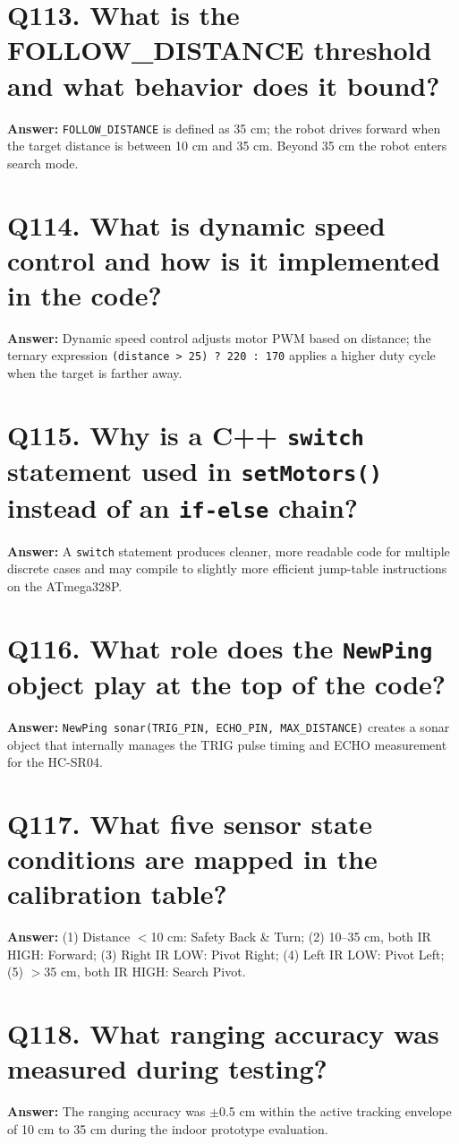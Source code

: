 \documentclass[12pt,a4paper,oneside]{report}
\begin{document}
\section{Q113. What is the FOLLOW\_DISTANCE threshold and what behavior does it bound?}
\textbf{Answer:} \texttt{FOLLOW\_DISTANCE} is defined as 35 cm; the robot drives forward when the target distance is between 10 cm and 35 cm. Beyond 35 cm the robot enters search mode.

\section{Q114. What is dynamic speed control and how is it implemented in the code?}
\textbf{Answer:} Dynamic speed control adjusts motor PWM based on distance; the ternary expression \texttt{(distance > 25) ? 220 : 170} applies a higher duty cycle when the target is farther away.

\section{Q115. Why is a C++ \texttt{switch} statement used in \texttt{setMotors()} instead of an \texttt{if-else} chain?}
\textbf{Answer:} A \texttt{switch} statement produces cleaner, more readable code for multiple discrete cases and may compile to slightly more efficient jump-table instructions on the ATmega328P.

\section{Q116. What role does the \texttt{NewPing} object play at the top of the code?}
\textbf{Answer:} \texttt{NewPing sonar(TRIG\_PIN, ECHO\_PIN, MAX\_DISTANCE)} creates a sonar object that internally manages the TRIG pulse timing and ECHO measurement for the HC-SR04.

\section{Q117. What five sensor state conditions are mapped in the calibration table?}
\textbf{Answer:} (1) Distance $<$10 cm: Safety Back \& Turn; (2) 10--35 cm, both IR HIGH: Forward; (3) Right IR LOW: Pivot Right; (4) Left IR LOW: Pivot Left; (5) $>$35 cm, both IR HIGH: Search Pivot.

\section{Q118. What ranging accuracy was measured during testing?}
\textbf{Answer:} The ranging accuracy was $\pm$0.5 cm within the active tracking envelope of 10 cm to 35 cm during the indoor prototype evaluation.
\end{document}
